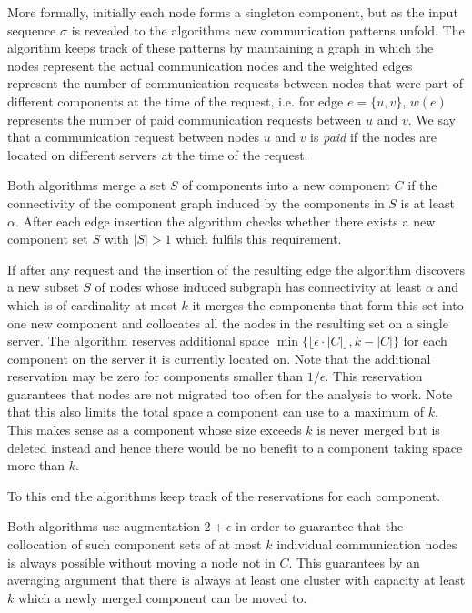 \documentclass[a4paper, 10pt]{article}
\theoremstyle{definition}
\begin{document}
	More formally, initially each node forms a singleton component, but as the input sequence $\sigma$ is revealed to the algorithms new communication patterns unfold. The algorithm keeps track of these patterns by maintaining a graph in which the nodes represent the actual communication nodes and the weighted edges represent the number of communication requests between nodes that were part of different components at the time of the request, i.e. for edge $e=\{u,v\}$, $w(e)$ represents the number of paid communication requests between $u$ and $v$. We say that a communication request between nodes $u$ and $v$ is \textit{paid} if the nodes are located on different servers at the time of the request.
	
	Both algorithms merge a set $S$ of components into a new component $C$ if the connectivity of the component graph induced by the components in $S$ is at least $\alpha$. After each edge insertion the algorithm checks whether there exists a new component set $S$ with $|S|>1$ which fulfils this requirement.
	
	If after any request and the insertion of the resulting edge the algorithm discovers a new subset $S$ of nodes whose induced subgraph has connectivity at least $\alpha$ and which is of cardinality at most $k$ it merges the components that form this set into one new component and collocates all the nodes in the resulting set on a single server. The algorithm reserves additional space $\min\{\lfloor\epsilon\cdot|C|\rfloor,k-|C|\}$ for each component on the server it is currently located on. Note that the additional reservation may be zero for components smaller than $1/\epsilon$. This reservation guarantees that nodes are not migrated too often for the analysis to work. Note that this also limits the total space a component can use to a maximum of $k$. This makes sense as a component whose size exceeds $k$ is never merged but is deleted instead and hence there would be no benefit to a component taking space more than $k$.
	
	To this end the algorithms keep track of the reservations for each component.
	
	Both algorithms use augmentation $2+\epsilon$ in order to guarantee that the collocation of such component sets of at most $k$ individual communication nodes is always possible without moving a node not in $C$. This guarantees by an averaging argument that there is always at least one cluster with capacity at least $k$ which a newly merged component can be moved to.
	
\end{document}

